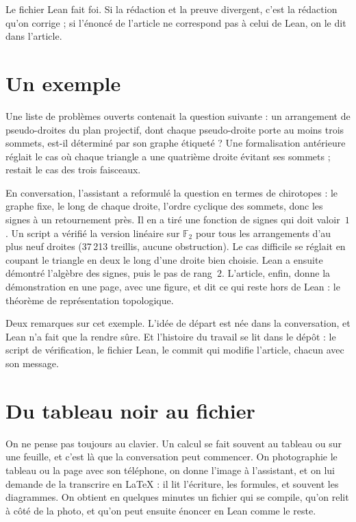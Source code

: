 \begin{regle}
Le fichier Lean fait foi. Si la rédaction et la preuve divergent, c'est la rédaction qu'on
corrige ; si l'énoncé de l'article ne correspond pas à celui de Lean, on le dit dans
l'article.
\end{regle}

\section{Un exemple}

Une liste de problèmes ouverts contenait la question suivante : un arrangement de
pseudo-droites du plan projectif, dont chaque pseudo-droite porte au moins trois sommets,
est-il déterminé par son graphe étiqueté ? Une formalisation antérieure réglait le cas où
chaque triangle a une quatrième droite évitant ses sommets ; restait le cas des trois
faisceaux.

\begin{exemple}
En conversation, l'assistant a reformulé la question en termes de chirotopes : le graphe
fixe, le long de chaque droite, l'ordre cyclique des sommets, donc les signes à un
retournement près. Il en a tiré une fonction de signes qui doit valoir~$1$. Un script a
vérifié la version linéaire sur $\mathbb F_2$ pour tous les arrangements d'au plus neuf
droites (37\,213 treillis, aucune obstruction). Le cas difficile se réglait en coupant le
triangle en deux le long d'une droite bien choisie. Lean a ensuite démontré l'algèbre des
signes, puis le pas de rang~$2$. L'article, enfin, donne la démonstration en une page, avec
une figure, et dit ce qui reste hors de Lean : le théorème de représentation
topologique.
\end{exemple}

Deux remarques sur cet exemple. L'idée de départ est née dans la conversation, et
Lean n'a fait que la rendre sûre. Et l'histoire du travail se lit dans le dépôt : le script
de vérification, le fichier Lean, le commit qui modifie l'article, chacun avec son message.

\section{Du tableau noir au fichier}

On ne pense pas toujours au clavier. Un calcul se fait souvent au tableau ou sur une feuille,
et c'est là que la conversation peut commencer. On photographie le tableau ou la page avec
son téléphone, on donne l'image à l'assistant, et on lui demande de la transcrire en LaTeX :
il lit l'écriture, les formules, et souvent les diagrammes. On obtient en quelques minutes
un fichier qui se compile, qu'on relit à côté de la photo, et qu'on peut ensuite énoncer
en Lean comme le reste.

